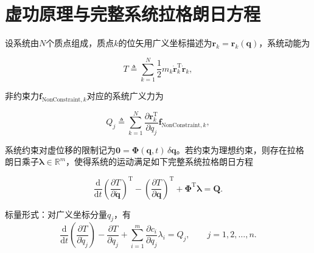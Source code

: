 \section{虚功原理与完整系统拉格朗日方程}
\begin{theorem}
设系统由$N$个质点组成，质点$k$的位矢用广义坐标描述为$\boldsymbol{r}_k = \boldsymbol{r}_k(\boldsymbol{q})$，系统动能为

\[
T \triangleq \sum_{k=1}^{N}\frac{1}{2}m_k\dot{\boldsymbol{r}}_k^{\mathrm{T}}\dot{\boldsymbol{r}}_k,
\]

非约束力$\boldsymbol{f}_{\text{NonConstraint},k}$对应的系统广义力为

\[
Q_j \triangleq \sum_{k=1}^{N}\frac{\partial \boldsymbol{r}_k^{\mathrm{T}}}{\partial q_j}\boldsymbol{f}_{\text{NonConstraint},k},
\]

系统约束对虚位移的限制记为$\boldsymbol{0} = \boldsymbol{\Phi}(\boldsymbol{q},t)\,\delta\boldsymbol{q}$。若约束为理想约束，则存在拉格朗日乘子$\boldsymbol{\lambda}\in\mathbb{R}^m$，使得系统的运动满足如下完整系统拉格朗日方程

\[
\frac{\mathrm{d}}{\mathrm{d}t}\left(\frac{\partial T}{\partial \dot{\boldsymbol{q}}}\right)^{\mathrm{T}} - \left(\frac{\partial T}{\partial \boldsymbol{q}}\right)^{\mathrm{T}} + \boldsymbol{\Phi}^{\mathrm{T}}\boldsymbol{\lambda} = \boldsymbol{Q}.
\]
\end{theorem}
标量形式：对广义坐标分量$q_j$，有
\[
\frac{\mathrm{d}}{\mathrm{d}t}\left(\frac{\partial T}{\partial \dot{q}_j}\right) - \frac{\partial T}{\partial q_j} + \sum_{i=1}^{m}\frac{\partial c_i}{\partial q_j}\lambda_i = Q_j, \qquad j = 1, 2, \ldots, n.
\]
